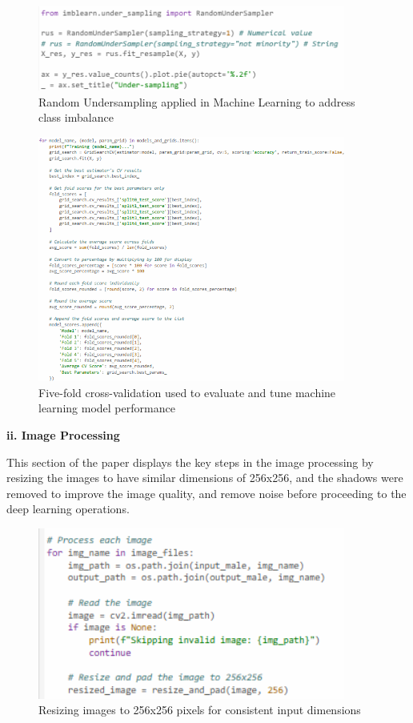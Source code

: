 \begin{figure}[!htbp]
	\centering
	\includegraphics[width=0.9\textwidth, angle=0]{figures/random_undersampling_ML.png}
	\caption{Random Undersampling applied in Machine Learning to address class imbalance}
\end{figure}

\begin{figure}[!htbp]
	\centering
	\includegraphics[width=0.9\textwidth, angle=0]{figures/ml_five fold_cv.png}
	\caption{Five-fold cross-validation used to evaluate and tune machine learning model performance}
\end{figure}

\newpage
\noindent\textbf{ii. Image Processing}
\vspace{-0.5cm}

This section of the paper displays the key steps in the image processing by resizing the images to have similar dimensions of 256x256, and the shadows were removed to improve the image quality, and remove noise before proceeding to the deep learning operations.
 
\begin{figure}[!htbp]
	\centering
	\includegraphics[width=0.9\textwidth, angle=0]{figures/same_dimensions.png}
	\caption{Resizing images to 256x256 pixels for consistent input dimensions}
\end{figure}

